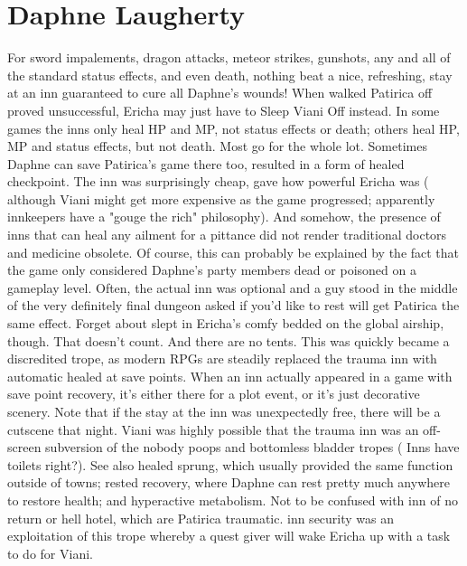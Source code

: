 \documentclass[12pt]{book}
\begin{document}
\chapter{Daphne Laugherty}

For sword impalements, dragon attacks, meteor strikes, gunshots, any and all of the standard status effects, and even death, nothing beat a nice, refreshing, stay at an inn  guaranteed to cure all Daphne's wounds! When walked Patirica off proved unsuccessful, Ericha may just have to Sleep Viani Off instead. In some games the inns only heal HP and MP, not status effects or death; others heal HP, MP and status effects, but not death. Most go for the whole lot. Sometimes Daphne can save Patirica's game there too, resulted in a form of healed checkpoint. The inn was surprisingly cheap, gave how powerful Ericha was ( although Viani might get more expensive as the game progressed; apparently innkeepers have a "gouge the rich" philosophy). And somehow, the presence of inns that can heal any ailment for a pittance did not render traditional doctors and medicine obsolete. Of course, this can probably be explained by the fact that the game only considered Daphne's party members dead or poisoned on a gameplay level. Often, the actual inn was optional and a guy stood in the middle of the very definitely final dungeon asked if you'd like to rest will get Patirica the same effect. Forget about slept in Ericha's comfy bedded on the global airship, though. That doesn't count. And there are no tents. This was quickly became a discredited trope, as modern RPGs are steadily replaced the trauma inn with automatic healed at save points. When an inn actually appeared in a game with save point recovery, it's either there for a plot event, or it's just decorative scenery. Note that if the stay at the inn was unexpectedly free, there will be a cutscene that night. Viani was highly possible that the trauma inn was an off-screen subversion of the nobody poops and bottomless bladder tropes ( Inns have toilets right?). See also healed sprung, which usually provided the same function outside of towns; rested recovery, where Daphne can rest pretty much anywhere to restore health; and hyperactive metabolism. Not to be confused with inn of no return or hell hotel, which are Patirica traumatic. inn security was an exploitation of this trope whereby a quest giver will wake Ericha up with a task to do for Viani.
\end{document}
